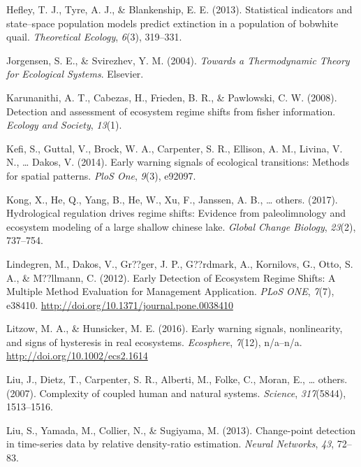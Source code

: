 \documentclass[12pt,twoside,openany]{reedthesis}
\begin{document}
\hypertarget{ref-hefley2013statistical}{}
Hefley, T. J., Tyre, A. J., \& Blankenship, E. E. (2013). Statistical
indicators and state--space population models predict extinction in a
population of bobwhite quail. \emph{Theoretical Ecology}, \emph{6}(3),
319--331.

\hypertarget{ref-jorgensen_towards_2004}{}
Jorgensen, S. E., \& Svirezhev, Y. M. (2004). \emph{Towards a
Thermodynamic Theory for Ecological Systems}. Elsevier.

\hypertarget{ref-karunanithi_detection_2008}{}
Karunanithi, A. T., Cabezas, H., Frieden, B. R., \& Pawlowski, C. W.
(2008). Detection and assessment of ecosystem regime shifts from fisher
information. \emph{Ecology and Society}, \emph{13}(1).

\hypertarget{ref-kefi2014early}{}
Kefi, S., Guttal, V., Brock, W. A., Carpenter, S. R., Ellison, A. M.,
Livina, V. N., \ldots{} Dakos, V. (2014). Early warning signals of
ecological transitions: Methods for spatial patterns. \emph{PloS One},
\emph{9}(3), e92097.

\hypertarget{ref-kong2017hydrological}{}
Kong, X., He, Q., Yang, B., He, W., Xu, F., Janssen, A. B., \ldots{}
others. (2017). Hydrological regulation drives regime shifts: Evidence
from paleolimnology and ecosystem modeling of a large shallow chinese
lake. \emph{Global Change Biology}, \emph{23}(2), 737--754.

\hypertarget{ref-lindegren_early_2012}{}
Lindegren, M., Dakos, V., Gr??ger, J. P., G??rdmark, A., Kornilovs, G.,
Otto, S. A., \& M??llmann, C. (2012). Early Detection of Ecosystem
Regime Shifts: A Multiple Method Evaluation for Management Application.
\emph{PLoS ONE}, \emph{7}(7), e38410.
\url{http://doi.org/10.1371/journal.pone.0038410}

\hypertarget{ref-litzow_early_2016}{}
Litzow, M. A., \& Hunsicker, M. E. (2016). Early warning signals,
nonlinearity, and signs of hysteresis in real ecosystems.
\emph{Ecosphere}, \emph{7}(12), n/a--n/a.
\url{http://doi.org/10.1002/ecs2.1614}

\hypertarget{ref-liu_complexity_2007}{}
Liu, J., Dietz, T., Carpenter, S. R., Alberti, M., Folke, C., Moran, E.,
\ldots{} others. (2007). Complexity of coupled human and natural
systems. \emph{Science}, \emph{317}(5844), 1513--1516.

\hypertarget{ref-liu2013change}{}
Liu, S., Yamada, M., Collier, N., \& Sugiyama, M. (2013). Change-point
detection in time-series data by relative density-ratio estimation.
\emph{Neural Networks}, \emph{43}, 72--83.
\end{document}
